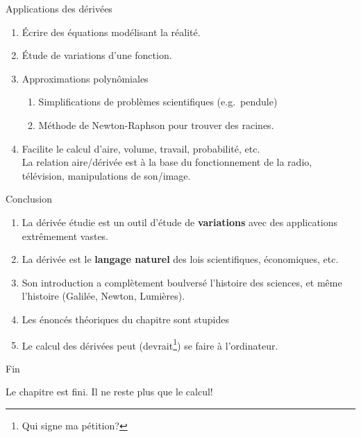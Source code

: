 \documentclass{beamer}
\begin{document}
\begin{frame}
    {Applications des dérivées}

    \begin{enumerate}
        \item Écrire des équations modélisant la réalité.
            \pause{}
        \item Étude de variations d'une fonction.
            \pause{}
        \item Approximations polynômiales
            \begin{enumerate}
                \item Simplifications de problèmes scientifiques (e.g.\ pendule)
                    \pause{}
                \item Méthode de Newton-Raphson pour trouver des racines.
            \end{enumerate}
            \pause{}
        \item Facilite le calcul d'aire, volume, travail, probabilité, etc.\\
            \pause{}
            La relation aire/dérivée est à la base du fonctionnement de la radio, télévision, manipulations de son/image.
    \end{enumerate}
\end{frame}

\begin{frame}
    {Conclusion}

    \begin{enumerate}
        \item La dérivée étudie est un outil d'étude de \textbf{variations} avec des applications extrêmement vastes.
            \pause{}
        \item La dérivée est le \textbf{langage naturel} des lois scientifiques, économiques, etc.
            \pause{}
        \item Son introduction a complètement boulversé l'histoire des sciences, et même l'histoire
            (Galilée, Newton, Lumières).
            \pause{}
        \item Les énoncés théoriques du chapitre sont stupides
            \pause{}
        \item Le calcul des dérivées peut (devrait\footnote{Qui signe ma pétition?}) se faire à l'ordinateur.
    \end{enumerate}
\end{frame}

\begin{frame}
    {Fin}

    Le chapitre est fini.
    Il ne reste plus que le calcul!
\end{frame}
\end{document}
